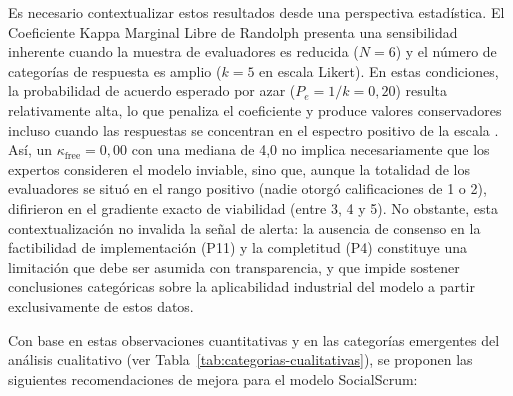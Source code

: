 Es necesario contextualizar estos resultados desde una perspectiva estadística. El Coeficiente Kappa Marginal Libre de Randolph \cite{randolph2005} presenta una sensibilidad inherente cuando la muestra de evaluadores es reducida ($N = 6$) y el número de categorías de respuesta es amplio ($k = 5$ en escala Likert). En estas condiciones, la probabilidad de acuerdo esperado por azar ($P_e = 1/k = 0{,}20$) resulta relativamente alta, lo que penaliza el coeficiente y produce valores conservadores incluso cuando las respuestas se concentran en el espectro positivo de la escala \cite{randolph2005}. Así, un $\kappa_{\text{free}} = 0{,}00$ con una mediana de 4,0 no implica necesariamente que los expertos consideren el modelo inviable, sino que, aunque la totalidad de los evaluadores se situó en el rango positivo (nadie otorgó calificaciones de 1 o 2), difirieron en el gradiente exacto de viabilidad (entre 3, 4 y 5). No obstante, esta contextualización no invalida la señal de alerta: la ausencia de consenso en la factibilidad de implementación (P11) y la completitud (P4) constituye una limitación que debe ser asumida con transparencia, y que impide sostener conclusiones categóricas sobre la aplicabilidad industrial del modelo a partir exclusivamente de estos datos.

Con base en estas observaciones cuantitativas y en las categorías emergentes del análisis cualitativo (ver Tabla~\ref{tab:categorias-cualitativas}), se proponen las siguientes recomendaciones de mejora para el modelo SocialScrum:

